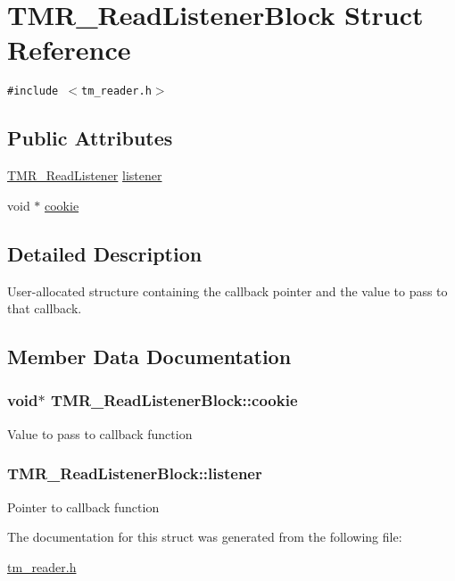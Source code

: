 \hypertarget{struct_t_m_r___read_listener_block}{
\section{TMR\_\-ReadListenerBlock Struct Reference}
\label{struct_t_m_r___read_listener_block}
}
{\tt \#include $<$tm\_\-reader.h$>$}

\subsection*{Public Attributes}
\begin{CompactItemize}
\item 
\hyperlink{tm__reader_8h_f63b1a99c7e1bca392fc5fb649a0bc97}{TMR\_\-ReadListener} \hyperlink{struct_t_m_r___read_listener_block_b78bab4812a6ded257ee1944476162f8}{listener}
\item 
void $\ast$ \hyperlink{struct_t_m_r___read_listener_block_be65dc98dbb28a216284a5c82aedc93f}{cookie}
\end{CompactItemize}


\subsection{Detailed Description}
User-allocated structure containing the callback pointer and the value to pass to that callback. 

\subsection{Member Data Documentation}
\hypertarget{struct_t_m_r___read_listener_block_be65dc98dbb28a216284a5c82aedc93f}{
\subsubsection[{cookie}]{\setlength{\rightskip}{0pt plus 5cm}void$\ast$ {\bf TMR\_\-ReadListenerBlock::cookie}}}
\label{struct_t_m_r___read_listener_block_be65dc98dbb28a216284a5c82aedc93f}


Value to pass to callback function \hypertarget{struct_t_m_r___read_listener_block_b78bab4812a6ded257ee1944476162f8}{
\subsubsection[{listener}]{ {\bf TMR\_\-ReadListenerBlock::listener}}}
\label{struct_t_m_r___read_listener_block_b78bab4812a6ded257ee1944476162f8}


Pointer to callback function 

The documentation for this struct was generated from the following file:\begin{CompactItemize}
\item 
\hyperlink{tm__reader_8h}{tm\_\-reader.h}\end{CompactItemize}
